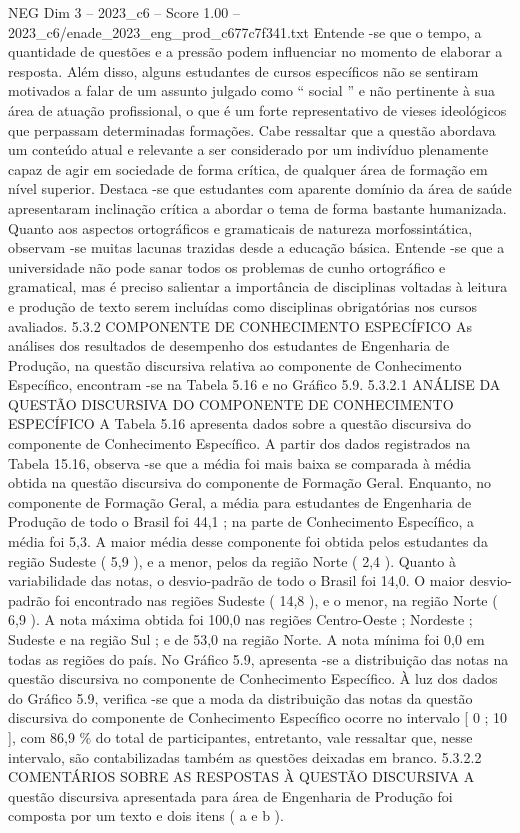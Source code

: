 \begin{textsample}{NEG Dim 3 – 2023\_c6 – Score 1.00 – 2023\_c6/enade\_2023\_eng\_prod\_c677c7f341.txt}
Entende -se que o tempo, a quantidade de questões e a pressão podem influenciar no momento de elaborar a resposta.
Além disso, alguns estudantes de cursos específicos não se sentiram motivados a falar de um assunto julgado como “ social ” e não pertinente à sua área de atuação profissional, o que é um forte representativo de vieses ideológicos que perpassam determinadas formações.
Cabe ressaltar que a questão abordava um conteúdo atual e relevante a ser considerado por um indivíduo plenamente capaz de agir em sociedade de forma crítica, de qualquer área de formação em nível superior.
Destaca -se que estudantes com aparente domínio da área de saúde apresentaram inclinação crítica a abordar o tema de forma bastante humanizada.
Quanto aos aspectos ortográficos e gramaticais de natureza morfossintática, observam -se muitas lacunas trazidas desde a educação básica.
Entende -se que a universidade não pode sanar todos os problemas de cunho ortográfico e gramatical, mas é preciso salientar a importância de disciplinas voltadas à leitura e produção de texto serem incluídas como disciplinas obrigatórias nos cursos avaliados. 5.3.2 COMPONENTE DE CONHECIMENTO ESPECÍFICO As análises dos resultados de desempenho dos estudantes de Engenharia de Produção, na questão discursiva relativa ao componente de Conhecimento Específico, encontram -se na Tabela 5.16 e no Gráfico 5.9. 5.3.2.1 ANÁLISE DA QUESTÃO DISCURSIVA DO COMPONENTE DE CONHECIMENTO ESPECÍFICO A Tabela 5.16 apresenta dados sobre a questão discursiva do componente de Conhecimento Específico.
A partir dos dados registrados na Tabela 15.16, observa -se que a média foi mais baixa se comparada à média obtida na questão discursiva do componente de Formação Geral.
Enquanto, no componente de Formação Geral, a média para estudantes de Engenharia de Produção de todo o Brasil foi 44,1 ; na parte de Conhecimento Específico, a média foi 5,3.
A maior média desse componente foi obtida pelos estudantes da região Sudeste ( 5,9 ), e a menor, pelos da região Norte ( 2,4 ).
Quanto à variabilidade das notas, o desvio-padrão de todo o Brasil foi 14,0.
O maior desvio-padrão foi encontrado nas regiões Sudeste ( 14,8 ), e o menor, na região Norte ( 6,9 ).
A nota máxima obtida foi 100,0 nas regiões Centro-Oeste ; Nordeste ; Sudeste e na região Sul ; e de 53,0 na região Norte.
A nota mínima foi 0,0 em todas as regiões do país.
No Gráfico 5.9, apresenta -se a distribuição das notas na questão discursiva no componente de Conhecimento Específico.
À luz dos dados do Gráfico 5.9, verifica -se que a moda da distribuição das notas da questão discursiva do componente de Conhecimento Específico ocorre no intervalo [ 0 ; 10 ], com 86,9 \% do total de participantes, entretanto, vale ressaltar que, nesse intervalo, são contabilizadas também as questões deixadas em branco. 5.3.2.2 COMENTÁRIOS SOBRE AS RESPOSTAS À QUESTÃO DISCURSIVA A questão discursiva apresentada para área de Engenharia de Produção foi composta por um texto e dois itens ( a e b ).

\end{textsample}
